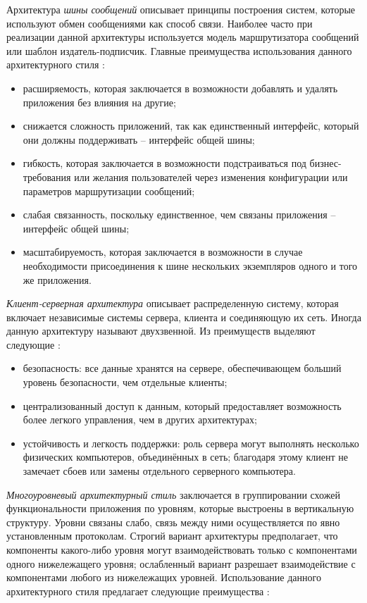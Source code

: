 Архитектура \emph{шины сообщений} описывает принципы построения систем, которые используют обмен сообщениями как
способ связи. Наиболее часто при реализации данной архитектуры используется модель маршрутизатора сообщений или
шаблон издатель-подписчик. Главные преимущества использования данного архитектурного стиля
\cite{application_architecture_guide}:

\begin{itemize}
	\item расширяемость, которая заключается в возможности добавлять и удалять приложения без влияния на другие;
	\item снижается сложность приложений, так как единственный интерфейс, который они должны поддерживать -- интерфейс общей шины;
	\item гибкость, которая заключается в возможности подстраиваться под биз\-нес-требования или желания пользователей через изменения конфигурации или параметров маршрутизации сообщений;
	\item слабая связанность, поскольку единственное, чем связаны приложения -- интерфейс общей шины;
	\item масштабируемость, которая заключается в возможности в случае необходимости присоединения к шине нескольких экземпляров одного и того же приложения.
\end{itemize}

\emph{Клиент-серверная архитектура} описывает распределенную систему, которая включает независимые системы сервера,
клиента и соединяющую их сеть. Иногда данную архитектуру называют двухзвенной. Из преимуществ выделяют следующие \cite{architecture_volosevich}:

\begin{itemize}
	\item безопасность: все данные хранятся на сервере, обеспечивающем больший уровень безопасности, чем отдельные клиенты;
	\item централизованный доступ к данным, который предоставляет возможность более легкого управления, чем в других архитектурах;
	\item устойчивость и легкость поддержки: роль сервера могут выполнять несколько физических компьютеров, объединённых в сеть; благодаря этому клиент не замечает сбоев или замены отдельного серверного компьютера.
\end{itemize}

\emph{Многоуровневый архитектурный стиль} заключается в группировании схожей функциональности приложения по уровням,
которые выстроены в вертикальную структуру. Уровни связаны слабо, связь между ними осуществляется по явно установленным
протоколам. Строгий вариант архитектуры предполагает, что компоненты какого-либо уровня могут взаимодействовать только
с компонентами одного нижележащего уровня; ослабленный вариант разрешает взаимодействие с компонентами любого из
нижележащих уровней. Использование данного архитектурного стиля предлагает следующие преимущества \cite{application_architecture_guide}:

